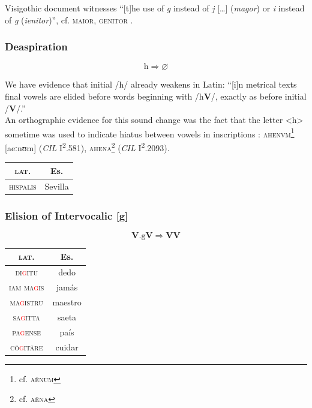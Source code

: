 \documentclass{report}[12pt]
\begin{document}
Visigothic document witnesses ``[t]he use of \emph{g} instead of \emph{j} [\dots] (\emph{magor}) or \emph{i} instead of \emph{g} (\emph{ienitor})'', cf. \textsc{maior}, \textsc{genitor} \parencite[p.~159]{latin_palaeography}.

\subsubsection*{Deaspiration}

\begin{tcolorbox}
  \[ \text{h} \Rightarrow \varnothing \]
\end{tcolorbox}

We have evidence that initial /h/ already weakens in Latin: ``[i]n metrical texts final vowels are elided before words beginning with /h\textbf{V}/, exactly as before initial /\textbf{V}/.'' \parencite[p.~87]{companion_to_latin} \\
An orthographic evidence for this sound change was the fact that the letter <h> sometime was used to indicate hiatus between vowels in inscriptions \parencite[p.~18]{companion_to_latin}: \textsc{ahenvm}\footnote{cf. \textsc{a\={e}num}} [aeːnʊm] (\emph{CIL} I\textsuperscript{2}.581), \textsc{ahena}\footnote{cf. \textsc{a\={e}na}} (\emph{CIL} I\textsuperscript{2}.2093).

\begin{tabular}{c c}
  \textsc{lat.} & Es. \\
  \hline
  \textsc{hispalis} & Sevilla
\end{tabular}

\subsubsection*{Elision of Intervocalic [g]}

\begin{tcolorbox}
  \[ \textbf{V}.\text{g}\textbf{V} \Rightarrow \textbf{V}\textbf{V} \]
\end{tcolorbox}

\begin{tabular}{c c}
  \textsc{lat.} & Es. \\
  \hline
  \textsc{di\textcolor{red}{g}itu} & dedo \\
  \textsc{iam ma\textcolor{red}{g}is} & jamás \\
  \textsc{ma\textcolor{red}{g}istru} & maestro \\
  \textsc{sa\textcolor{red}{g}itta} & saeta \\
  \textsc{pa\textcolor{red}{g}ense} & país \\
  \textsc{c\={o}\textcolor{red}{g}it\={a}re} & cuidar \\
\end{tabular}
\end{document}
